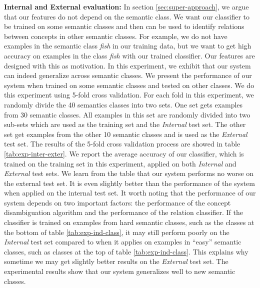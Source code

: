 {\bf Internal and External evaluation:} In section
\ref{sec:super-approach}, we argue that our features do not depend on
the semantic class.  We want our classifier to be trained on some
semantic classes and then can be used to identify relations between
concepts in other semantic classes. For example, we do not have
examples in the semantic class {\em fish} in our training data, but we
want to get high accuracy on examples in the class {\em fish} with our
trained classifier. Our features are designed with this as
motivation. In this experiment, we exhibit that our system can indeed
generalize across semantic classes. We present the performance of our
system when trained on some semantic classes and tested on other
classes. We do this experiment using 5-fold cross validation. For each
fold in this experiment, we randomly divide the 40 semantics classes
into two sets. One set gets examples from 30 semantic classes. All
examples in this set are randomly divided into two sub-sets which are
used as the training set and the {\em Internal} test set. The other
set get examples from the other 10 semantic classes and is used as the
{\em External} test set. The results of the 5-fold cross validation
process are showed in table \ref{tab:exp-inter-exter}. We report the
average accuracy of our classifier, which is trained on the training
set in this experiment, applied on both {\em Internal} and {\em
  External} test sets. We learn from the table that our system
performs no worse on the external test set. It is even slightly better
than the performance of the system when applied on the internal test
set. It worth noting that the performance of our system depends on two
important factors: the performance of the concept disambiguation
algorithm and the performance of the relation classifier. If the
classifier is trained on examples from hard semantic classes, such as
the classes at the bottom of table \ref{tab:exp-ind-class}, it may
still perform poorly on the {\em Internal} test set compared to when
it applies on examples in ``easy'' semantic classes, such as classes
at the top of table \ref{tab:exp-ind-class}. This explains why
sometime we may get slightly better results on the {\em External} test
set. The experimental results show that our system generalizes well to
new semantic classes.

